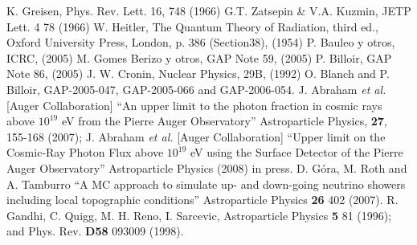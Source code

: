 \begin{thebibliography}{1}
 K. Greisen, Phys. Rev. Lett. 16, 748 (1966)
 G.T. Zatsepin \& V.A. Kuzmin, JETP Lett. 4 78 (1966)
 W. Heitler, The Quantum Theory of Radiation, third ed., Oxford University Press, London, p. 386 (Section38), (1954)
 P. Bauleo y otros, ICRC, (2005)
 M. Gomes Berizo y otros, GAP Note 59, (2005) 
 P. Billoir, GAP Note 86, (2005)
 J. W. Cronin, Nuclear Physics, 29B, (1992)
 O. Blanch and P. Billoir, GAP-2005-047, GAP-2005-066 and GAP-2006-054.
 J. Abraham {\it et al.} [Auger Collaboration] ``An upper limit to the photon fraction in cosmic rays above $10^{19}$ eV from the Pierre Auger Observatory'' Astroparticle Physics, {\bf 27}, 155-168 (2007); J. Abraham {\it et al.} [Auger Collaboration] ``Upper limit on the Cosmic-Ray Photon Flux above $10^{19}$ eV using the Surface Detector of the Pierre Auger Observatory'' Astroparticle Physics (2008) in press.
 D. G\'ora, M. Roth and A. Tamburro ``A MC approach to simulate up- and down-going neutrino showers including local topographic conditions'' Astroparticle Physics {\bf 26} 402 (2007).
 R. Gandhi, C. Quigg, M. H. Reno, I. Sarcevic, Astroparticle Physics {\bf 5} 81 (1996); and Phys. Rev. {\bf D58} 093009 (1998).
\end{thebibliography}